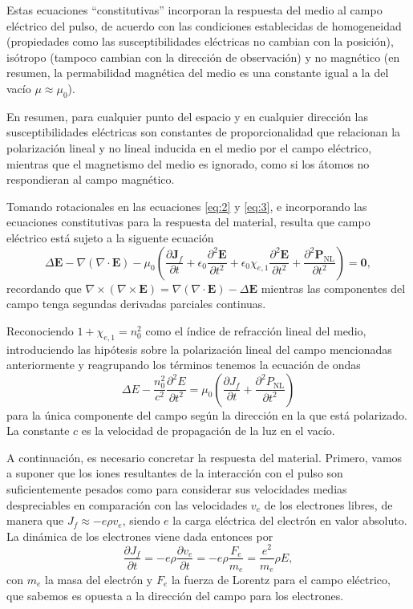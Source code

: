 \documentclass{scrartcl} %
\newcommand*{\pdv}[2]{\frac{\partial#1}{\partial#2}}
\newcommand*{\pdvN}[3]{\frac{\partial^{#3}#1}{\partial{#2}^{#3}}}
\newcommand*{\grad}{\nabla}
\newcommand*{\curl}{{\nabla}\times}
\newcommand*{\diver}{\nabla\cdot}
\newcommand*{\laplacian}{\Delta}
\begin{document}
Estas ecuaciones \enquote{constitutivas} incorporan la respuesta del medio al campo eléctrico del pulso, de acuerdo con las condiciones establecidas de homogeneidad (propiedades como las susceptibilidades eléctricas no cambian con la posición), isótropo (tampoco cambian con la dirección de observación) y no magnético (en resumen, la permabilidad magnética del medio es una constante igual a la del vacío $\mu \approx \mu_{0}$).

En resumen, para cualquier punto del espacio y en cualquier dirección las susceptibilidades eléctricas son constantes de proporcionalidad que relacionan la polarización lineal y no lineal inducida en el medio por el campo eléctrico, mientras que el magnetismo del medio es ignorado, como si los átomos no respondieran al campo magnético.

Tomando rotacionales en las ecuaciones \eqref{eq:2} y \eqref{eq:3}, e incorporando las ecuaciones constitutivas para la respuesta del material, resulta que campo eléctrico está sujeto a la siguente ecuación
\begin{equation}\label{eq:4}
  \laplacian \symbf{E} - \grad (\diver \symbf{E}) - \mu_{0}\left(\pdv{\symbf{J}_{f}}{t} + \epsilon_{0}\pdvN{\symbf{E}}{t}{2} + \epsilon_{0} \chi_{e,1}\pdvN{\symbf{E}}{t}{2} + \pdvN{\symbf{P_{\mathrm{NL}}}}{t}{2}\right) = \symbf{0},
\end{equation}
recordando que $\curl (\curl \symbf{E}) = \grad (\diver \symbf{E}) - \laplacian \symbf{E}$ mientras las componentes del campo tenga segundas derivadas parciales continuas.

Reconociendo $1 + \chi_{e,1} = n^{2}_{0}$ como el índice de refracción lineal del medio, introduciendo las hipótesis sobre la polarización lineal del campo mencionadas anteriormente y reagrupando los términos tenemos la ecuación de ondas
\begin{equation}\label{eq:5}
  \laplacian E - \frac{n^{2}_{0}}{c^{2}}\pdvN{E}{t}{2} = \mu_{0} \left(\pdv{J_{f}}{t} + \pdvN{P_{\mathrm{NL}}}{t}{2}\right)
\end{equation}
para la única componente del campo según la dirección en la que está polarizado. La constante $c$ es la velocidad de propagación de la luz en el vacío.

A continuación, es necesario concretar la respuesta del material. Primero, vamos a suponer que los iones resultantes de la interacción con el pulso son suficientemente pesados como para considerar sus velocidades medias despreciables en comparación con las velocidades $v_{e}$ de los electrones libres, de manera que $J_{f} \approx -e \rho v_{e}$, siendo $e$ la carga eléctrica del electrón en valor absoluto. La dinámica de los electrones viene dada entonces por
\begin{equation}\label{eq:6}
  \pdv{J_{f}}{t} = -e \rho \pdv{v_{e}}{t} = -e \rho \frac{F_{e}}{m_{e}} = \frac{e^{2}}{m_{e}} \rho E,
\end{equation}
con $m_{e}$ la masa del electrón y $F_{e}$ la fuerza de Lorentz para el campo eléctrico, que sabemos es opuesta a la dirección del campo para los electrones. 
\end{document}
